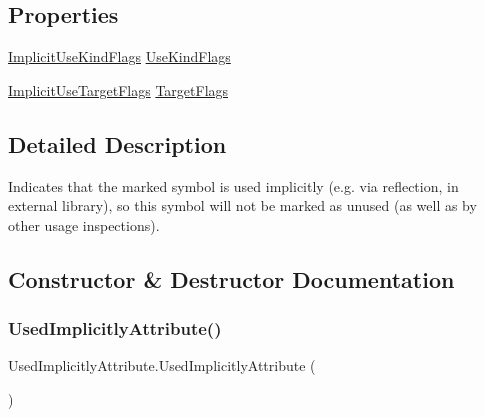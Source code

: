 \subsection*{Properties}
\begin{DoxyCompactItemize}
\item 
\mbox{\hyperlink{_annotations_8cs_acc26806cec0b003502b38c6c2ee67fd1}{Implicit\+Use\+Kind\+Flags}} \mbox{\hyperlink{class_used_implicitly_attribute_a7755e382c9638ee26bc7a45584ced5ff}{Use\+Kind\+Flags}}
\item 
\mbox{\hyperlink{_annotations_8cs_a59f21202ead30f3d1e2093e42214bf7c}{Implicit\+Use\+Target\+Flags}} \mbox{\hyperlink{class_used_implicitly_attribute_a2efb3586ffa41ca609769f825c07a508}{Target\+Flags}}
\end{DoxyCompactItemize}


\subsection{Detailed Description}
Indicates that the marked symbol is used implicitly (e.\+g. via reflection, in external library), so this symbol will not be marked as unused (as well as by other usage inspections). 



\subsection{Constructor \& Destructor Documentation}
\mbox{\label{class_used_implicitly_attribute_a58cbf99ae8d931a919ad26a1299dad17}} 
\subsubsection{\texorpdfstring{Used\+Implicitly\+Attribute()}{UsedImplicitlyAttribute()}\hspace{0.1cm}{\footnotesize\ttfamily [1/4]}}
{\footnotesize\ttfamily Used\+Implicitly\+Attribute.\+Used\+Implicitly\+Attribute (\begin{DoxyParamCaption}{ }\end{DoxyParamCaption})}

